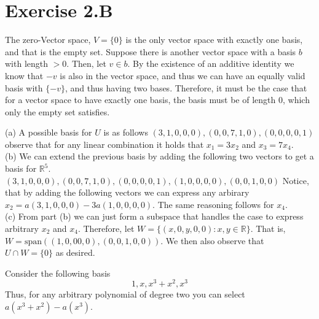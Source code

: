 \documentclass[10pt, twocolumn]{article}
\newcommand{\R}{\mathbb{R}}
\newcommand{\vspan}{\text{span}}
\begin{document}
\section{Exercise 2.B}
\begin{q}[Problem 1]
    The zero-Vector space, $ V = \{0\} $ is the only vector space with exactly one basis, and that is the empty set. 
    Suppose there is another vector space with a basis $ b $ with length $ > 0 $. 
    Then, let $ v \in b $. 
    By the existence of an additive identity we know that $ -v $ is also in the vector space, and thus we can have an equally valid basis with $ \{-v\} $, and thus having two bases.
    Therefore, it must be the case that for a vector space to have exactly one basis, the basis must be of length 0, which only the empty set satisfies. 
\end{q}
\begin{q}[Problem 3]
    (a) A possible basis for $ U $ is as follows
    $ (3,1, 0, 0, 0), (0, 0, 7, 1, 0), (0, 0, 0, 0, 1) $
    observe that for any linear combination it holds that $ x_1 = 3x_2 $ and $ x_3 = 7x_4 $. \\
    (b) We can extend the previous basis by adding the following two vectors to get a basis for $ \R ^5 $.
    $ (3,1, 0, 0, 0), (0, 0, 7, 1, 0), (0, 0, 0, 0, 1), (1, 0, 0, 0, 0), (0, 0, 1, 0, 0) $
    Notice, that by adding the following vectors we can express any arbirary $ x_2 = a(3, 1, 0, 0, 0) - 3a(1, 0, 0, 0, 0) $. 
    The same reasoning follows for $ x_4$. \\
    (c) From part (b) we can just form a subspace that handles the case to express arbitrary $ x_2 $ and $ x_4 $.
    Therefore, let $ W = \{(x, 0, y, 0, 0) \colon x, y \in \R \} $. That is, $ W = \vspan((1, 0, 0 0, 0), (0, 0, 1, 0, 0))$. 
    We then also observe that $ U \cap W = \{0\} $ as desired. 
\end{q}
\begin{q}[Problem 5]
    Consider the following basis 
    $$ 1, x, x^3 + x^2, x^3 $$ 
    Thus, for any arbitrary polynomial of degree two you can select $ a(x^3 + x^2) - a(x^3) $. 
\end{q}
\begin{q}[Problem 7]
    
\end{q}
\end{document}
